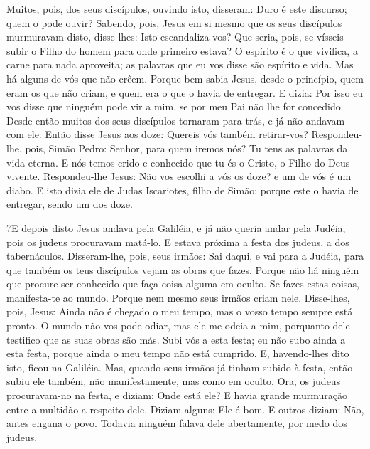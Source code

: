 Muitos, pois, dos seus discípulos, ouvindo isto, disseram: Duro é
este discurso; quem o pode ouvir? Sabendo, pois, Jesus em si
mesmo que os seus discípulos murmuravam disto, disse-lhes: Isto
escandaliza-vos? Que seria, pois, se vísseis subir o Filho do
homem para onde primeiro estava? O espírito é o que vivifica,
a carne para nada aproveita; as palavras que eu vos disse são
espírito e vida. Mas há alguns de vós que não crêem. Porque
bem sabia Jesus, desde o princípio, quem eram os que não criam, e
quem era o que o havia de entregar. E dizia: Por isso eu vos
disse que ninguém pode vir a mim, se por meu Pai não lhe for
concedido. Desde então muitos dos seus discípulos tornaram
para trás, e já não andavam com ele. Então disse Jesus aos
doze: Quereis vós também retirar-vos? Respondeu-lhe, pois,
Simão Pedro: Senhor, para quem iremos nós? Tu tens as palavras da
vida eterna. E nós temos crido e conhecido que tu és o
Cristo, o Filho do Deus vivente. Respondeu-lhe Jesus: Não vos
escolhi a vós os doze? e um de vós é um diabo. E isto dizia
ele de Judas Iscariotes, filho de Simão; porque este o havia de
entregar, sendo um dos doze.

\medskip

\lettrine{7} E depois disto Jesus andava pela Galiléia, e já
não queria andar pela Judéia, pois os judeus procuravam matá-lo.
E estava próxima a festa dos judeus, a dos tabernáculos.
Disseram-lhe, pois, seus irmãos: Sai daqui, e vai para a Judéia,
para que também os teus discípulos vejam as obras que fazes.
Porque não há ninguém que procure ser conhecido que faça coisa
alguma em oculto. Se fazes estas coisas, manifesta-te ao mundo.
Porque nem mesmo seus irmãos criam nele. Disse-lhes, pois,
Jesus: Ainda não é chegado o meu tempo, mas o vosso tempo sempre
está pronto. O mundo não vos pode odiar, mas ele me odeia a mim,
porquanto dele testifico que as suas obras são más. Subi vós a
esta festa; eu não subo ainda a esta festa, porque ainda o meu tempo
não está cumprido. E, havendo-lhes dito isto, ficou na Galiléia.
Mas, quando seus irmãos já tinham subido à festa, então subiu
ele também, não manifestamente, mas como em oculto. Ora, os
judeus procuravam-no na festa, e diziam: Onde está ele? E
havia grande murmuração entre a multidão a respeito dele. Diziam
alguns: Ele é bom. E outros diziam: Não, antes engana o povo.
Todavia ninguém falava dele abertamente, por medo dos judeus.

